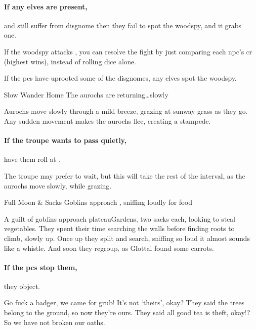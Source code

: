 \paragraph{If any elves are present,}
and still suffer from \gls{disgnome} then
they fail to spot the \gls{woodspy}, and it grabs one.

If the \gls{woodspy} attacks , you can resolve the fight by just comparing each \gls{npc}'s \gls{cr} (highest wins), instead of rolling dice alone.

If the \glspl{pc} have uprooted some of the \glspl{disgnome}, any elves spot the \gls{woodspy}.

{Slow Wander Home}%
{The aurochs are returning\ldots slowly}%

Aurochs move slowly through a mild breeze, grazing at \gls{sunway} grass as they go.
Any sudden movement makes the aurochs flee, creating a stampede.

\paragraph{If the troupe wants to pass quietly,}
have them roll  at \tn[8].

The troupe may prefer to wait, but this will take the rest of the \gls{interval}, as the aurochs move slowly, while grazing.

{Full Moon \& Sacks}%
{Goblins approach , sniffing loudly for food}%

A guilt of goblins approach \gls{plateauGardens}, two sacks each, looking to steal vegetables.
They spent their time searching the walls before finding roots to climb, slowly up.
Once up they split and search, sniffing so loud it almost sounds like a whistle.
And soon they regroup, as Glottal found some carrots.

\paragraph{If the \glspl{pc} stop them,}
they object.

\begin{speechtext}
  Go fuck a badger, we came for grub!
  It's not `theirs', okay?
  They said the trees belong to the ground, so now they're ours.
  They said all good tea is theft, okay!?
  So we have not broken our oaths.
\end{speechtext}

